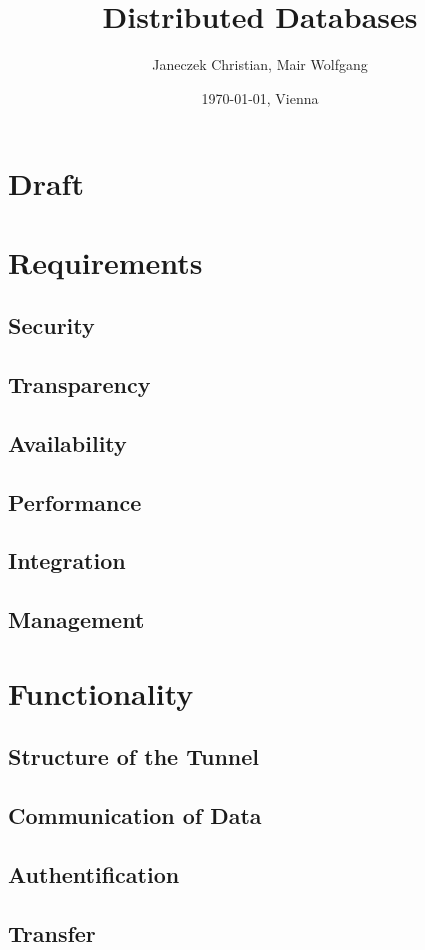 \documentclass[11pt,a4paper]{article}
\title{Distributed Databases}
\author{Janeczek Christian, Mair Wolfgang}
\affil{IT Department TGM, Vienna}
\date{\today{}, Vienna}
\begin{document}
\maketitle
\newpage
\tableofcontents
\newpage

\section{Draft}
\newpage

\section{Requirements}
\subsection{Security}
\subsection{Transparency}
\subsection{Availability}
\subsection{Performance}
\subsection{Integration}
\subsection{Management}
\newpage

\section{Functionality}
\subsection{Structure of the Tunnel}
\subsection{Communication of Data}
\subsection{Authentification}
\subsection{Transfer}
\end{document}
